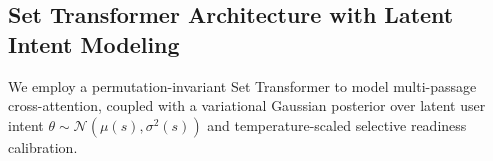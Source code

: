 \subsection{Set Transformer Architecture with Latent Intent Modeling}
We employ a permutation-invariant Set Transformer \cite{lee2019set} to model multi-passage cross-attention, coupled with a variational Gaussian posterior over latent user intent $\theta \sim \mathcal{N}(\mu(s), \sigma^2(s))$ and temperature-scaled selective readiness calibration.
